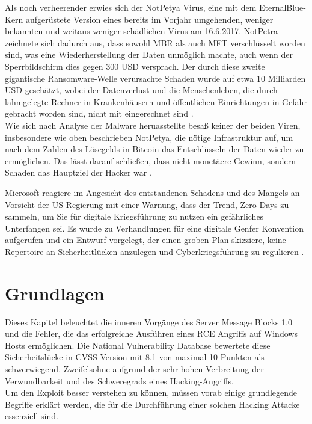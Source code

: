 \documentclass[DIV=12,headings=normal,pdftex,headinclude=false,footinclude=false,final]{scrreprt}
\begin{document}
\noindent
Als noch verheerender erwies sich der NotPetya Virus, eine mit dem EternalBlue-Kern aufgerüstete Version eines bereits im Vorjahr umgehenden, weniger bekannten und weitaus weniger schädlichen Virus am 16.6.2017. NotPetra zeichnete sich dadurch aus, dass sowohl MBR als auch MFT verschlüsselt worden sind, was eine Wiederherstellung der Daten unmöglich machte, auch wenn der Sperrbildschirm dies gegen 300 USD versprach. Der durch diese zweite gigantische Ransomware-Welle verursachte Schaden wurde auf etwa 10 Milliarden USD geschätzt, wobei der Datenverlust und die Menschenleben, die durch lahmgelegte Rechner in Krankenhäusern und öffentlichen Einrichtungen in Gefahr gebracht worden sind, nicht mit eingerechnet sind \cite{Avast}.\\
Wie sich nach Analyse der Malware heruasstellte besaß keiner der beiden Viren, insbesondere wie oben beschrieben NotPetya, die nötige Infrastruktur auf, um nach dem Zahlen des Lösegelds in Bitcoin das Entschlüsseln der Daten wieder zu ermöglichen. Das lässt darauf schließen, dass nicht monetäere Gewinn, sondern Schaden das Hauptziel der Hacker war \cite{Sil}.

\noindent
Microsoft reagiere im Angesicht des entstandenen Schadens und des Mangels an Vorsicht der US-Regierung mit einer Warnung, dass der Trend, Zero-Days zu sammeln, um Sie für digitale Kriegsführung zu nutzen ein gefährliches Unterfangen sei. Es wurde zu Verhandlungen für eine digitale Genfer Konvention aufgerufen und ein Entwurf vorgelegt, der einen groben Plan skizziere, keine Repertoire an Sicherheitlücken anzulegen und Cyberkriegsführung zu regulieren \cite{MS:EB}.

\chapter{Grundlagen}
Dieses Kapitel beleuchtet die inneren Vorgänge des Server Message Blocks 1.0 und die Fehler, die das erfolgreiche Ausführen eines RCE Angriffs auf Windows Hosts ermöglichen. Die National Vulnerability Database bewertete diese Sicherheitslücke in CVSS Version mit 8.1 von maximal 10 Punkten \cite{NVD} als schwerwiegend. Zweifelsohne aufgrund der sehr hohen Verbreitung der Verwundbarkeit und des Schweregrads eines Hacking-Angriffs. \\
Um den Exploit besser verstehen zu können, müssen vorab einige grundlegende Begriffe erklärt werden, die für die Durchführung einer solchen Hacking Attacke essenziell sind.
\end{document}
